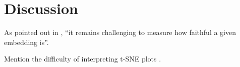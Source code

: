 \chapter{Discussion}\label{chapter:discussion}

As pointed out in \cite{kobak21}, \enquote{it remains challenging to measure how faithful a given embedding is}.  


Mention the difficulty of interpreting t-SNE plots \cite{Wa16Distill}. 